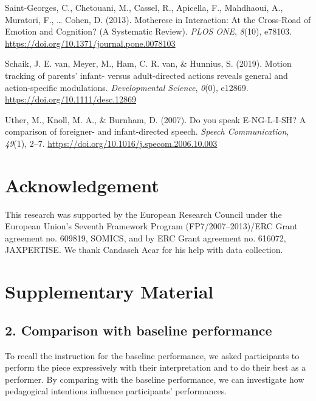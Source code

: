 \documentclass[
  man,floatsintext]{apa6}
\newlength{\cslhangindent}
\newlength{\cslentryspacingunit} %
\newenvironment{CSLReferences}[2] %
 {%
  \setlength{\parindent}{0pt}
  \ifodd #1
  \let\oldpar\par
  \def\par{\hangindent=\cslhangindent\oldpar}
  \fi
  \setlength{\parskip}{#2\cslentryspacingunit}
 }%
 {}
\begin{document}
\begin{CSLReferences}{1}{0}
\leavevmode{}%
Saint-Georges, C., Chetouani, M., Cassel, R., Apicella, F., Mahdhaoui, A., Muratori, F., \ldots{} Cohen, D. (2013). Motherese in {Interaction}: {At} the {Cross-Road} of {Emotion} and {Cognition}? ({A Systematic Review}). \emph{PLOS ONE}, \emph{8}(10), e78103. \url{https://doi.org/10.1371/journal.pone.0078103}

\leavevmode{}%
Schaik, J. E. van, Meyer, M., Ham, C. R. van, \& Hunnius, S. (2019). Motion tracking of parents' infant- versus adult-directed actions reveals general and action-specific modulations. \emph{Developmental Science}, \emph{0}(0), e12869. \url{https://doi.org/10.1111/desc.12869}

\leavevmode{}%
Uther, M., Knoll, M. A., \& Burnham, D. (2007). Do you speak {E-NG-L-I-SH}? {A} comparison of foreigner- and infant-directed speech. \emph{Speech Communication}, \emph{49}(1), 2--7. \url{https://doi.org/10.1016/j.specom.2006.10.003}

\end{CSLReferences}

\endgroup

\hypertarget{acknowledgement}{%
\section{Acknowledgement}\label{acknowledgement}}

This research was supported by the European Research Council under the European Union's Seventh Framework Program (FP7/2007--2013)/ERC Grant agreement no. 609819, SOMICS, and by ERC Grant agreement no. 616072, JAXPERTISE. We thank Candasch Acar for his help with data collection.

\clearpage

\hypertarget{supplementary-material}{%
\section{Supplementary Material}\label{supplementary-material}}

\hypertarget{comparison-with-baseline-performance}{%
\subsection{2. Comparison with baseline performance}\label{comparison-with-baseline-performance}}

To recall the instruction for the baseline performance, we asked participants to perform the piece expressively with their interpretation and to do their best as a performer. By comparing with the baseline performance, we can investigate how pedagogical intentions influence participants' performances.
\end{document}
